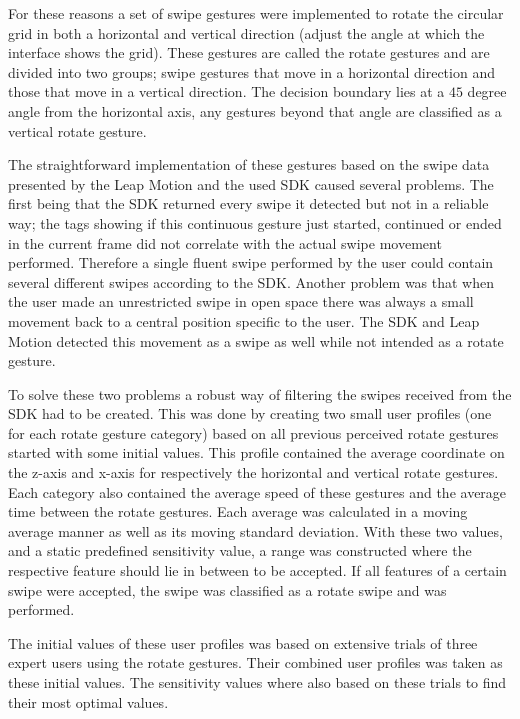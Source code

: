 For these reasons a set of swipe gestures were implemented to rotate
the circular grid in both a horizontal and vertical direction (adjust
the angle at which the interface shows the grid). These gestures are
called the rotate gestures and are divided into two groups; swipe
gestures that move in a horizontal direction and those that move in
a vertical direction. The decision boundary lies at a $45$ degree
angle from the horizontal axis, any gestures beyond that angle are
classified as a vertical rotate gesture.

The straightforward implementation of these gestures based on the
swipe data presented by the Leap Motion and the used SDK caused several
problems. The first being that the SDK returned every swipe it detected
but not in a reliable way; the tags showing if this continuous gesture
just started, continued or ended in the current frame did not correlate
with the actual swipe movement performed. Therefore a single fluent
swipe performed by the user could contain several different swipes
according to the SDK. Another problem was that when the user made
an unrestricted swipe in open space there was always a small movement
back to a central position specific to the user. The SDK and Leap
Motion detected this movement as a swipe as well while not intended
as a rotate gesture. 

To solve these two problems a robust way of filtering the swipes received
from the SDK had to be created. This was done by creating two small
user profiles (one for each rotate gesture category) based on all
previous perceived rotate gestures started with some initial values.
This profile contained the average coordinate on the z-axis and x-axis
for respectively the horizontal and vertical rotate gestures. Each
category also contained the average speed of these gestures and the
average time between the rotate gestures. Each average was calculated
in a moving average manner as well as its moving standard deviation.
With these two values, and a static predefined sensitivity value,
a range was constructed where the respective feature should lie in
between to be accepted. If all features of a certain swipe were accepted,
the swipe was classified as a rotate swipe and was performed. 

The initial values of these user profiles was based on extensive trials
of three expert users using the rotate gestures. Their combined user
profiles was taken as these initial values. The sensitivity values
where also based on these trials to find their most optimal values.

